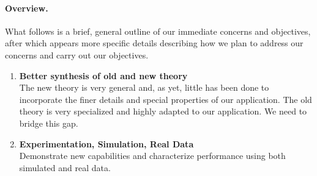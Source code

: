\paragraph{Overview.}  What follows is a brief, general outline of our
immediate concerns and objectives, after which appears more specific details
describing how we plan to address our concerns and carry out our objectives.
\begin{enumerate}
\item {\bf Better synthesis of old and new theory}\\
The new theory is very general and, as yet, little has been done to
incorporate the finer details and special properties of our application.  
The old theory is very specialized and highly adapted to our application.  
We need to bridge this gap.
\item {\bf Experimentation, Simulation, Real Data}\\
Demonstrate new capabilities and characterize performance using both simulated
and real data. 
\end{enumerate}

